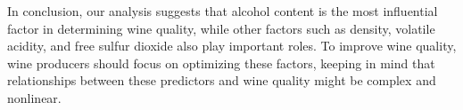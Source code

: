 \documentclass[
]{article}
\begin{document}
In conclusion, our analysis suggests that alcohol content is the most
influential factor in determining wine quality, while other factors such
as density, volatile acidity, and free sulfur dioxide also play
important roles. To improve wine quality, wine producers should focus on
optimizing these factors, keeping in mind that relationships between
these predictors and wine quality might be complex and nonlinear.
\end{document}
